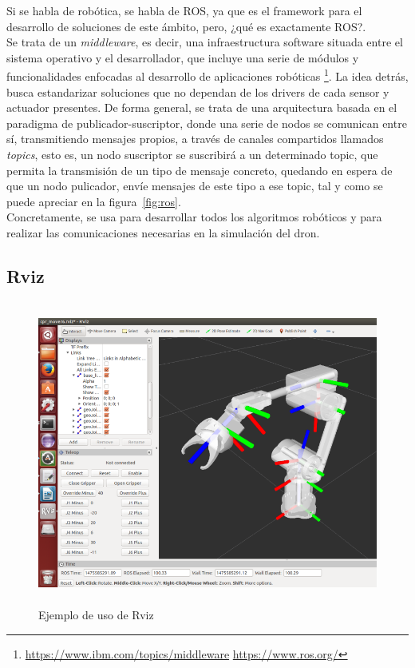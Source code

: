 Si se habla de robótica, se habla de \ac{ROS}, ya que es el framework para el desarrollo de soluciones de este ámbito, pero, ¿qué es exactamente \ac{ROS}?.\\

Se trata de un \emph{middleware}, es decir, una infraestructura software situada entre el sistema operativo y el desarrollador, que incluye una serie de módulos y funcionalidades enfocadas al desarrollo de aplicaciones robóticas \footnote[6]{\url{https://www.ibm.com/topics/middleware} \url{https://www.ros.org/}}. La idea detrás, busca estandarizar soluciones que no dependan de los drivers de cada sensor y actuador presentes. De forma general, se trata de una arquitectura basada en el paradigma de publicador-suscriptor, donde una serie de nodos se comunican entre sí, transmitiendo mensajes propios, a través de canales compartidos llamados \emph{topics}, esto es, un nodo suscriptor se suscribirá a un determinado topic, que permita la transmisión de un tipo de mensaje concreto, quedando en espera de que un nodo pulicador, envíe mensajes de este tipo a ese topic, tal y como se puede apreciar en la figura~\ref{fig:ros}.\\

Concretamente, se usa para desarrollar todos los algoritmos robóticos y para realizar las comunicaciones necesarias en la simulación del dron.\\

\subsection{Rviz}
\label{subsec:rviz}

\begin{figure} [t]
	\begin{center}
	\includegraphics[height=10cm]{imagenes/cap3/3_rviz_example.png}
	\end{center}
	\caption[Ejemplo de uso de Rviz]{Ejemplo de uso de Rviz}
	\label{fig:rviz}
\end{figure}

